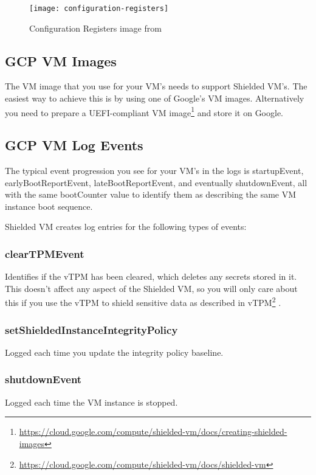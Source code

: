 \begin{figure}[!ht]
    \centering
    \texttt{[image: configuration-registers]}
    \caption{Configuration Registers image from \cite{arthur_platform_2015}}
    \label{fig:configuration-registers}
\end{figure}

\subsection*{GCP VM Images}
The VM image that you use for your VM’s needs to support Shielded VM’s. 
The easiest way to achieve this is by using one of Google’s VM images. 
Alternatively you need to prepare a 
UEFI-compliant VM image\footnote{\url{https://cloud.google.com/compute/shielded-vm/docs/creating-shielded-images}} 
and store it on Google.

\subsection*{GCP VM Log Events}
The typical event progression you see for your VM’s in the logs is startupEvent, 
earlyBootReportEvent, lateBootReportEvent, and eventually shutdownEvent, 
all with the same bootCounter value to identify them 
as describing the same VM instance boot sequence.

Shielded VM creates log entries for the following types of events:

\subsubsection*{clearTPMEvent}
Identifies if the vTPM has been cleared, which deletes any secrets stored in it. 
This doesn't affect any aspect of the Shielded VM, 
so you will only care about this if you use the vTPM 
to shield sensitive data as described in vTPM\footnote{\url{https://cloud.google.com/compute/shielded-vm/docs/shielded-vm}} 
\citep{google_what_2022}.

\subsubsection*{setShieldedInstanceIntegrityPolicy}
Logged each time you update the integrity policy baseline.

\subsubsection*{shutdownEvent}
Logged each time the VM instance is stopped.

